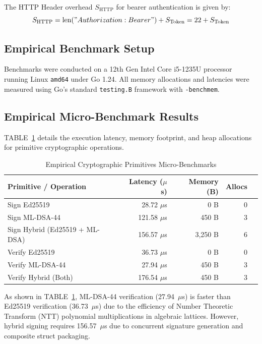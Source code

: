 \documentclass{article}
\begin{document}
\begin{IEEEkeywords}
The HTTP Header overhead $S_{\text{HTTP}}$ for bearer authentication is given by:
\begin{equation}
S_{\text{HTTP}} = \text{len}("Authorization: Bearer ") + S_{\text{Token}} = 22 + S_{\text{Token}}
\end{equation}

\subsection{Empirical Benchmark Setup}
Benchmarks were conducted on a 12th Gen Intel Core i5-1235U processor running Linux \texttt{amd64} under Go 1.24. All memory allocations and latencies were measured using Go's standard \texttt{testing.B} framework with \texttt{-benchmem}.

\subsection{Empirical Micro-Benchmark Results}

TABLE~\ref{tab:crypto_benchmarks} details the execution latency, memory footprint, and heap allocations for primitive cryptographic operations.

\begin{table}[htbp]
\caption{Empirical Cryptographic Primitives Micro-Benchmarks}
\label{tab:crypto_benchmarks}
\centering
\begin{tabular}{lrrrr}
\toprule
\textbf{Primitive / Operation} & \textbf{Latency ($\mu$s)} & \textbf{Memory (B)} & \textbf{Allocs} \\
\midrule
Sign Ed25519 & 28.72 $\mu$s & 0 B & 0 \\
Sign ML-DSA-44 & 121.58 $\mu$s & 450 B & 3 \\
Sign Hybrid (Ed25519 + ML-DSA) & 156.57 $\mu$s & 3,250 B & 6 \\
\midrule
Verify Ed25519 & 36.73 $\mu$s & 0 B & 0 \\
Verify ML-DSA-44 & 27.94 $\mu$s & 450 B & 3 \\
Verify Hybrid (Both) & 176.54 $\mu$s & 450 B & 3 \\
\bottomrule
\end{tabular}
\end{table}

As shown in TABLE~\ref{tab:crypto_benchmarks}, ML-DSA-44 verification (27.94~$\mu$s) is faster than Ed25519 verification (36.73~$\mu$s) due to the efficiency of Number Theoretic Transform (NTT) polynomial multiplications in algebraic lattices. However, hybrid signing requires 156.57~$\mu$s due to concurrent signature generation and composite struct packaging.


\end{IEEEkeywords}
\end{document}
